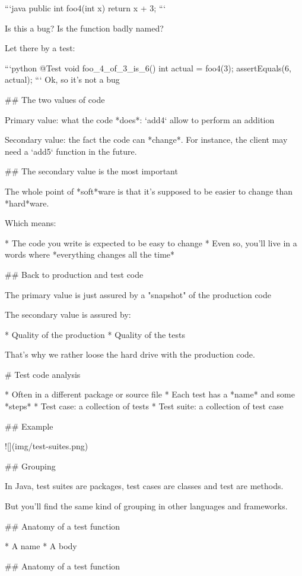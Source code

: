 ```java
public int foo4(int x) {
    return x + 3;
}
```

Is this a bug? Is the function badly named?


\vfill

Let there by a test:

```python
@Test
void foo_4_of_3_is_6() {
    int actual = foo4(3);
    assertEquals(6, actual);
}
```
Ok, so it's not a bug

## The two values of code

Primary value: what the code *does*: `add4` allow to perform an addition

Secondary value: the fact the code can *change*. For instance, the client may
need a `add5` function in the future.

## The secondary value is the most important

The whole point of *soft*ware is that it's supposed to be easier to change
than *hard*ware.

Which means:

* The code you write is expected to be easy to change
* Even so, you'll live in a words where *everything changes all the time*

## Back to production and test code

The primary value is just assured by a "snapshot" of the production code

The secondary value is assured by:

* Quality of the production
* Quality of the tests

\vfill

That's why we rather loose the hard drive with the production code.


# Test code analysis

* Often in a different package or source file
* Each test has a *name* and some *steps*
* Test case: a collection of tests
* Test suite: a collection of test case

## Example

![](img/test-suites.png)

## Grouping

In Java, test suites are packages, test cases are classes and test are
methods.

But you'll find the same kind of grouping in other languages and frameworks.

## Anatomy of a test function

* A name
* A body

## Anatomy of a test function

